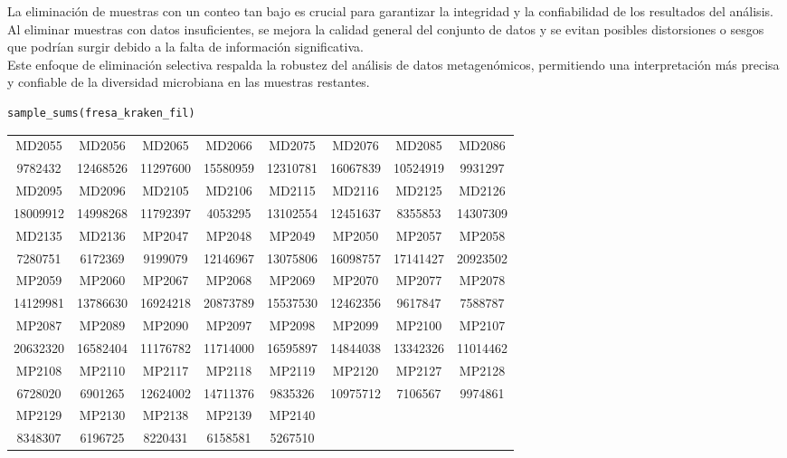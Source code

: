 La eliminación de muestras con un conteo tan bajo es crucial para garantizar la integridad y la confiabilidad de los resultados del análisis. Al eliminar muestras con datos insuficientes, se mejora la calidad general del conjunto de datos y se evitan posibles distorsiones o sesgos que podrían surgir debido a la falta de información significativa.\\

Este enfoque de eliminación selectiva respalda la robustez del análisis de datos metagenómicos, permitiendo una interpretación más precisa y confiable de la diversidad microbiana en las muestras restantes.\\

\begin{lstlisting}[basicstyle=\small] 
sample_sums(fresa_kraken_fil)
\end{lstlisting}
\resizebox{0.9\textwidth}{!} {
\begin{tabular}{ c c c c c c c c }
MD2055 & MD2056 & MD2065 & MD2066 & MD2075 & MD2076 & MD2085 & MD2086 \\
9782432 & 12468526 & 11297600 & 15580959 & 12310781 & 16067839 & 10524919 & 9931297 \\
MD2095 & MD2096 & MD2105 & MD2106 & MD2115 & MD2116 & MD2125 & MD2126 \\
18009912 & 14998268 & 11792397 & 4053295 & 13102554 & 12451637 & 8355853 & 14307309 \\
MD2135 & MD2136 & MP2047 & MP2048 & MP2049 & MP2050 & MP2057 & MP2058 \\
7280751 & 6172369 & 9199079 & 12146967 & 13075806 & 16098757 & 17141427 & 20923502 \\
MP2059 & MP2060 & MP2067 & MP2068 & MP2069 & MP2070 & MP2077 & MP2078 \\
14129981 & 13786630 & 16924218 & 20873789 & 15537530 & 12462356 & 9617847 & 7588787 \\
MP2087 & MP2089 & MP2090 & MP2097 & MP2098 & MP2099 & MP2100 & MP2107 \\
20632320 & 16582404 & 11176782 & 11714000 & 16595897 & 14844038 & 13342326 & 11014462 \\
MP2108 & MP2110 & MP2117 & MP2118 & MP2119 & MP2120 & MP2127 & MP2128 \\
6728020 & 6901265 & 12624002 & 14711376 & 9835326 & 10975712 & 7106567 & 9974861 \\
MP2129 & MP2130 & MP2138 & MP2139 & MP2140 \\
8348307 & 6196725 & 8220431 & 6158581 & 5267510
\end{tabular}
}


